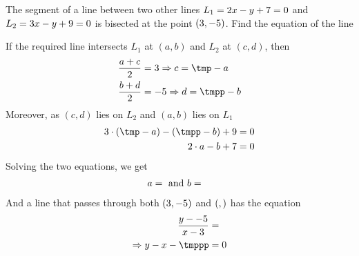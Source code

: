 \gcalcexpr[0]{\vbeight}{\vbthree * \vbseven + \vbfive} %
\gcalcexpr[0]{\vbnine}{\vbtwo - \vbeight} %
\gcalcexpr[0]{\vbten}{\vbone - \vbseven} %
\gcalcexpr[0]{\tmppp}{\vbten * \vbtwo - \vbnine * \vbone}

\question The segment of a line between two other lines $L_1 = 2 x - y + 7 = 0$ and $L_2 = 3 x -y + 9 = 0$ is bisected at the point $(3, -5)$. Find the equation of the line

\insertQR[-5pt]{}

\watchout

\ifprintanswers
 
\fi 

\begin{solution}
	If the required line intersects $L_1$ at $(a,b)$ and $L_2$ at $(c,d)$, then 
	\begin{align}
		\dfrac{a + c}{2} &= \vbone \Rightarrow c = \tmp - a \\
		\dfrac{b + d}{2} &= \vbtwo \Rightarrow d = \tmpp - b
	\end{align}
	Moreover, as $(c,d)$ lies on $L_2$ and $(a,b)$ lies on $L_1$
	\begin{align}
		\vbfour\cdot(\tmp - a) - (\tmpp - b) + \vbsix &= 0 \\
		\vbthree\cdot a - b + \vbfive &= 0 
	\end{align}
	Solving the two equations, we get 
	\begin{align}
		a &=  \text{ and } b = 
	\end{align}
	And a line that passes through both $(3, -5)$ and $(, )$ has the equation
	\begin{align}
		\dfrac{y - \vbtwo}{x - \vbone} &= \dfrac{\vbnine}{\vbten}\\
		\Rightarrow \vbten y - \vbnine x - \tmppp &= 0
	\end{align}
\end{solution}
